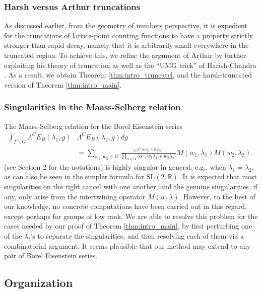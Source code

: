 \documentclass[11pt]{amsart}
\def\R{\mathbb{R}}
\numberwithin{theorem}{section}
\numberwithin{equation}{section}
\theoremstyle{remark}
\theoremstyle{definition}
\newcommand{\SL}{\mathrm{SL}}
\begin{document}
\subsubsection*{Harsh versus Arthur truncations}

As discussed earlier, from the geometry of numbers perspective, it is expedient for the truncations of lattice-point counting functions to have a property strictly stronger than rapid decay, namely that it is arbitrarily small everywhere in the truncated region. To achieve this, we refine the argument of Arthur \cite[Proposition 13.2]{Art05} by further exploiting his theory of truncation as well as the ``UMG trick'' of Harish-Chandra \cite{Har76}. As a result, we obtain Theorem \ref{thm:intro_truncate}, and the harsh-truncated version of Theorem \ref{thm:intro_main}.


\subsubsection*{Singularities in the Maass-Selberg relation}

The Maass-Selberg relation for the Borel Eisenstein series
\begin{align*}
\int_{\Gamma \backslash G} \Lambda^CE_B(\lambda_1,g) &\Lambda^CE_B(\lambda_2,g) dg \\
&= \sum_{w_1,w_2 \in W} \frac{e^{\langle C, w_1\lambda_1+w_2\lambda_2\rangle}}{\prod_{\alpha \in \Delta}\langle \alpha^\vee, w_1\lambda_1+w_2\lambda_2\rangle}M(w_1,\lambda_1)M(w_2,\lambda_2),
\end{align*}
(see Section 2 for the notations) is highly singular in general, e.g., when $\lambda_1=\lambda_2$, as can also be seen in the simpler formula for $\SL(2,\R)$.  It is expected that most singularities on the right cancel with one another, and the genuine singularities, if any, only arise from the intertwining operator $M(w,\lambda)$. However, to the best of our knowledge, no concrete computations have been carried out in this regard, except perhaps for groups of low rank. We are able to resolve this problem for the cases needed by our proof of Theorem \ref{thm:intro_main}, by first perturbing one of the $\lambda_i$'s to separate the singularities, and then resolving each of them via a combinatorial argument. It seems plausible that our method may extend to any pair of Borel Eisenstein series.


\subsection{Organization}
\end{document}
